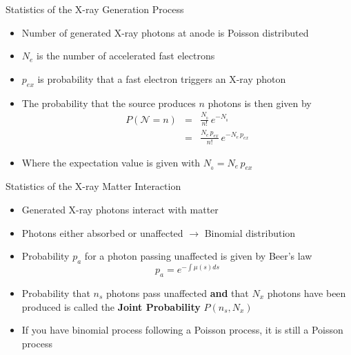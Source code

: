 \begin{frame}{Statistics of the X-ray Generation Process}
    \begin{itemize}
        \item Number of generated X-ray photons at anode is Poisson distributed
        \item $N_e$ is the number of accelerated fast electrons
        \item $p_{ex}$ is probability that a fast electron triggers an X-ray photon
        \item The probability that the source produces $n$ photons is then given by
              \vspace{0.5cm}
              \begin{eqnarray}
                  P(\mathcal{N}=n) &=& \frac{N_{_0}}{n!}\,e^{-N_{_0}}\nonumber\\[0.5cm]
                  &=& \frac{N_e\,p_{ex}}{n!}\,e^{-N_e\,p_{ex}}\nonumber
              \end{eqnarray}
              \vspace{0.01cm}
        \item Where the expectation value is given with $N_{_0}=N_e\,p_{ex}$
    \end{itemize}
\end{frame}

\begin{frame}{Statistics of the X-ray Matter Interaction}
    \begin{itemize}
        \item Generated X-ray photons interact with matter
        \item Photons either absorbed or unaffected $\rightarrow$ Binomial distribution
        \item Probability $p_a$ for a photon passing unaffected is given by Beer's law
              \begin{equation*}
                  p_a = e^{-\int \mu(s) ds}
              \end{equation*}
        \item Probability that $n_s$ photons pass unaffected \textbf{and} that $N_x$ photons have been produced is called the \textbf{Joint Probability} $P(n_s,N_x)$
        \item If you have binomial process following a Poisson process, it is still a Poisson process
    \end{itemize}
\end{frame}

